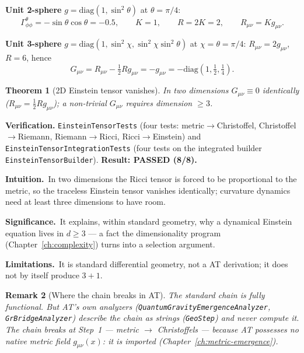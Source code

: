 \documentclass[10pt,twoside,openany]{book}
\newtheorem{theorem}{Theorem}[chapter]
\newtheorem{remark}[theorem]{Remark}
\newcommand{\theoremnotes}[3]{%
  \par\medskip\noindent
  \textbf{Intuition.}\ #1\par
  \textbf{Significance.}\ #2\par
  \textbf{Limitations.}\ #3\par}
\begin{document}
\textbf{Unit 2-sphere} $g=\mathrm{diag}(1,\sin^2\theta)$ at $\theta=\pi/4$:
\begin{equation}
\Gamma^\theta_{\phi\phi} = -\sin\theta\cos\theta = -0.5,
\qquad K = 1, \qquad R = 2K = 2, \qquad R_{\mu\nu}=K g_{\mu\nu}.
\end{equation}

\textbf{Unit 3-sphere} $g=\mathrm{diag}(1,\sin^2\chi,\sin^2\chi\sin^2\theta)$ at
$\chi=\theta=\pi/4$: $R_{\mu\nu}=2g_{\mu\nu}$, $R=6$, hence
\begin{equation}
G_{\mu\nu} = R_{\mu\nu} - \tfrac12 R g_{\mu\nu} = -g_{\mu\nu}
= -\mathrm{diag}(1,\tfrac12,\tfrac14).
\end{equation}

\begin{theorem}[2D Einstein tensor vanishes]
In two dimensions $G_{\mu\nu}\equiv0$ identically ($R_{\mu\nu}=\tfrac12 R g_{\mu\nu}$); a
non-trivial $G_{\mu\nu}$ requires dimension $\ge3$.
\end{theorem}

\textbf{Verification.} \texttt{EinsteinTensorTests} (four tests: metric$\to$Christoffel,
Christoffel$\to$Riemann, Riemann$\to$Ricci, Ricci$\to$Einstein) and
\texttt{EinsteinTensorIntegrationTests} (four tests on the integrated builder
\texttt{EinsteinTensorBuilder}). \textbf{Result: PASSED (8/8).}

\theoremnotes
{In two dimensions the Ricci tensor is forced to be proportional to the metric, so the
traceless Einstein tensor vanishes identically; curvature dynamics need at least three
dimensions to have room.}
{It explains, within standard geometry, why a dynamical Einstein equation lives in
$d\ge3$ --- a fact the dimensionality program (Chapter~\ref{ch:complexity}) turns into a
selection argument.}
{It is standard differential geometry, not a AT derivation; it does not by itself
produce $3{+}1$.}

\begin{remark}[Where the chain breaks in AT]
The standard chain is fully functional. But AT's own analyzers
(\texttt{QuantumGravityEmergenceAnalyzer}, \texttt{GrBridgeAnalyzer}) \emph{describe} the
chain as strings (\texttt{GeoStep}) and \emph{never compute} it. The chain breaks at
Step~1 — \emph{metric} $\to$ \emph{Christoffels} — because AT possesses no native metric
field $g_{\mu\nu}(x)$: it is imported (Chapter~\ref{ch:metric-emergence}).
\end{remark}

\end{document}
